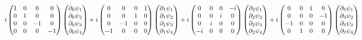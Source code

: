 \begin{equation*}\hspace*{-3cm}
    i \begin{pmatrix} 1 & 0 & 0 & 0 \\ 0 & 1 & 0 & 0 \\ 0 & 0 & -1 & 0 \\ 0 & 0 & 0 & -1 \end{pmatrix} \begin{pmatrix} \partial_0 \psi_1 \\ \partial_0 \psi_2 \\ \partial_0 \psi_3 \\ \partial_0 \psi_4 \end{pmatrix} + i \begin{pmatrix} 0 & 0 & 0 & 1 \\ 0 & 0 & 1 & 0 \\ 0 & -1 & 0 & 0 \\ -1 & 0 & 0 & 0 \end{pmatrix} \begin{pmatrix} \partial_1 \psi_1 \\ \partial_1 \psi_2 \\ \partial_1 \psi_3 \\ \partial_1 \psi_4 \end{pmatrix} + i \begin{pmatrix} 0 & 0 & 0 & -i \\ 0 & 0 & i & 0 \\ 0 & i & 0 & 0 \\ -i & 0 & 0 & 0 \end{pmatrix} \begin{pmatrix} \partial_2 \psi_1 \\ \partial_2 \psi_2 \\ \partial_2 \psi_3 \\ \partial_2 \psi_4 \end{pmatrix} + i \begin{pmatrix} 0 & 0 & 1 & 0 \\ 0 & 0 & 0 & -1 \\ -1 & 0 & 0 & 0 \\ 0 & 1 & 0 & 0 \end{pmatrix} \begin{pmatrix} \partial_3 \psi_1 \\ \partial_3 \psi_2 \\ \partial_3 \psi_3 \\ \partial_3 \psi_4 \end{pmatrix}
\end{equation*}

